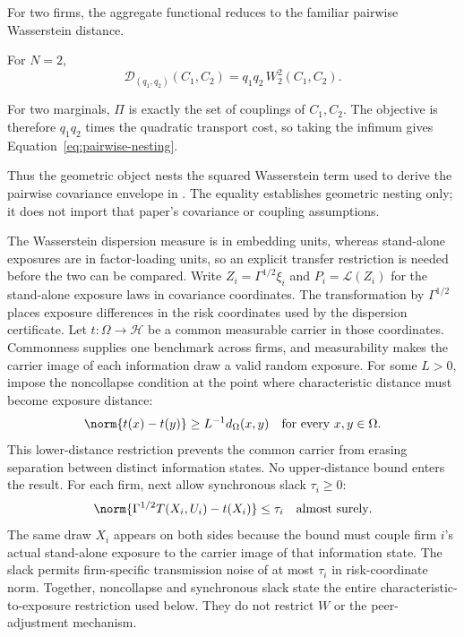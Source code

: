 For two firms, the aggregate functional reduces to the familiar
pairwise Wasserstein distance.

\begin{theorem}\label{thm:pairwise-nesting}
  For $N=2$,
  \begin{equation}\label{eq:pairwise-nesting}
    \mathcal D_{(q_1,q_2)}(C_1,C_2)=q_1q_2\,W_2^2(C_1,C_2).
  \end{equation}
\end{theorem}
For two marginals, $\Pi$ is exactly the set of couplings of $C_1,C_2$.
The objective is therefore $q_1q_2$ times the quadratic transport
cost, so taking the infimum gives Equation~\eqref{eq:pairwise-nesting}.

Thus the geometric object nests the squared Wasserstein term used to
derive the pairwise covariance envelope in \citet{gawronsky_continuous_2026}.
The equality establishes geometric nesting only; it does not import
that paper's covariance or coupling assumptions.

The Wasserstein dispersion measure is in embedding units, whereas
stand-alone exposures are in factor-loading units, so an explicit
transfer restriction is needed before the two can be compared.
Write $Z_i=\Gamma^{1/2}\xi_i$ and $P_i=\mathcal L(Z_i)$ for the
stand-alone exposure laws in covariance coordinates.
The transformation by $\Gamma^{1/2}$ places exposure differences in
the risk coordinates used by the dispersion certificate.
Let $t:\Omega\to\mathcal H$ be a common measurable carrier in those coordinates.
Commonness supplies one benchmark across firms, and measurability
makes the carrier image of each information draw a valid random exposure.
For some $L>0$, impose the noncollapse condition at the point where
characteristic distance must become exposure distance:
\[
  \norm{t(x)-t(y)}\geq L^{-1}d_\Omega(x,y)
  \quad\text{for every }x,y\in\Omega.
\]
This lower-distance restriction prevents the common carrier from
erasing separation between distinct information states.
No upper-distance bound enters the result.
For each firm, next allow synchronous slack $\tau_i\geq0$:
\[
  \norm{\Gamma^{1/2}T(X_i,U_i)-t(X_i)}\leq\tau_i
  \quad\text{almost surely}.
\]
The same draw $X_i$ appears on both sides because the bound must
couple firm $i$'s actual stand-alone exposure to the carrier image of
that information state.
The slack permits firm-specific transmission noise of at most
$\tau_i$ in risk-coordinate norm.
Together, noncollapse and synchronous slack state the entire
characteristic-to-exposure restriction used below.
They do not restrict $W$ or the peer-adjustment mechanism.


